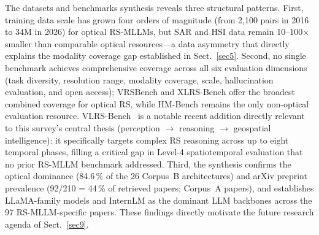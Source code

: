 The datasets and benchmarks synthesis reveals three structural patterns.
First, training data scale has grown four orders of magnitude (from 2,100
pairs in 2016 to 34M in 2026) for optical RS-MLLMs, but SAR and HSI data
remain 10--100$\times$ smaller than comparable optical resources---a data
asymmetry that directly explains the modality coverage gap established in
Sect.~\ref{sec5}. Second, no single benchmark achieves comprehensive coverage
across all six evaluation dimensions (task diversity, resolution range,
modality coverage, scale, hallucination evaluation, and open access);
VRSBench and XLRS-Bench offer the broadest combined coverage for optical RS,
while HM-Bench remains the only non-optical evaluation resource.
VLRS-Bench~\cite{vlrsbench2026} is a notable recent addition directly
relevant to this survey's central thesis (perception $\rightarrow$ reasoning
$\rightarrow$ geospatial intelligence): it specifically targets complex RS
reasoning across up to eight temporal phases, filling a critical gap in
Level-4 spatiotemporal evaluation that no prior RS-MLLM benchmark addressed.
Third, the synthesis confirms the optical dominance (84.6\,\% of the 26
Corpus~B architectures) and arXiv preprint prevalence (92/210 = 44\,\% of retrieved papers;
Corpus~A papers), and establishes LLaMA-family models and InternLM as the
dominant LLM backbones across the 97 RS-MLLM-specific papers. These findings
directly motivate the future research agenda of Sect.~\ref{sec9}.
